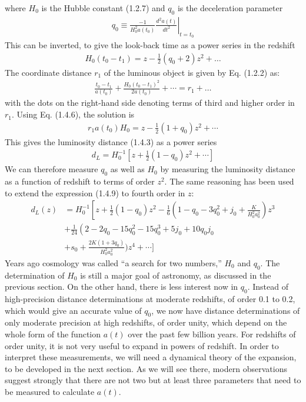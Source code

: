 \documentclass[11pt,a4paper,dvipdfmx]{jsarticle}
\theoremstyle{plain}
\theoremstyle{break}
\begin{document}
where $H_0$ is the Hubble constant (1.2.7) and $q_0$ is the deceleration parameter
\begin{align}
  q_{0} \equiv \frac{-1}{H_{0}^{2} a\left(t_{0}\right)}\left.\frac{d^{2} a(t)}{d t^{2}}\right|_{t=t_{0}}
\end{align}
This can be inverted, to give the look-back time as a power series in the redshift
\begin{align}
  H_{0}\left(t_{0}-t_{1}\right)=z-\frac{1}{2}\left(q_{0}+2\right) z^{2}+\ldots
\end{align}
The coordinate distance $r_1$ of the luminous object is given by Eq. (1.2.2) as:
\begin{align}
  \frac{t_{0}-t_{1}}{a\left(t_{0}\right)}+\frac{H_{0}\left(t_{0}-t_{1}\right)^{2}}{2 a\left(t_{0}\right)}+\cdots=r_{1}+\ldots
\end{align}
with the dots on the right-hand side denoting terms of third and higher order
in $r_1$. Using Eq. (1.4.6), the solution is
\begin{align}
  r_{1} a\left(t_{0}\right) H_{0}=z-\frac{1}{2}\left(1+q_{0}\right) z^{2}+\cdots
\end{align}
This gives the luminosity distance (1.4.3) as a power series
\begin{align}
  d_{L}=H_{0}^{-1}\left[z+\frac{1}{2}\left(1-q_{0}\right) z^{2}+\cdots\right]
\end{align}
We can therefore measure $q_0$ as well as $H_0$ by measuring the luminosity distance as a function of redshift to terms of order $z^2$.
The same reasoning has been used to extend the expression (1.4.9) to fourth order in $z$:
\begin{align}
  d_{L}(z)
  & =H_{0}^{-1}\left[z+\frac{1}{2}\left(1-q_{0}\right) z^{2}-\frac{1}{6}\left(1-q_{0}-3 q_{0}^{2}+j_{0}+\frac{K}{H_{0}^{2} a_{0}^{2}}\right) z^{3}\right. \\
  & +\frac{1}{24}\left(2-2 q_{0}-15 q_{0}^{2}-15 q_{0}^{3}+5 j_{0}+10 q_{0} j_{0}\right.\\
  &+s_{0}+\frac{2 K\left(1+3 q_{0}\right)}{H_{0}^{2} a_{0}^{2}} ) z^{4}+\cdots ]
\end{align}
Years ago cosmology was called “a search for two numbers,” $H_0$ and $q_0$. The determination of $H_0$ is still a major goal of astronomy, as discussed in the previous section. On the other hand, there is less interest now in $q_0$.
Instead of high-precision distance determinations at moderate redshifts, of order 0.1 to 0.2, which would give an accurate value of $q_0$, we now have distance determinations of only moderate precision at high redshifts, of order unity, which depend on the whole form of the function $a(t)$ over the past few billion years.
For redshifts of order unity, it is not very useful to expand in powers of redshift.
In order to interpret these measurements, we will need a dynamical theory of the expansion, to be developed in the next section. As we will see there, modern observations suggest strongly that there are not two but at least three parameters that need to be measured to calculate $a(t)$.
\end{document}

